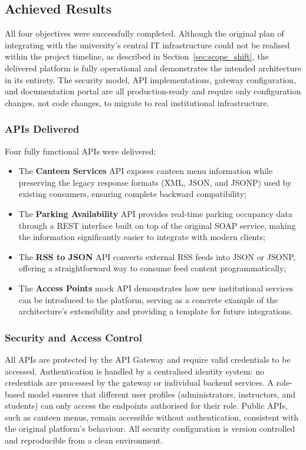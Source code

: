 \documentclass[12pt, a4paper]{report}
\begin{document}
\subsection{Achieved Results}
All four objectives were successfully completed. Although the original plan of integrating
with the university's central IT infrastructure could not be realised within the project
timeline, as described in Section~\ref{sec:scope_shift}, the delivered platform is
fully operational and demonstrates the intended architecture in its entirety. The security
model, API implementations, gateway configuration, and documentation portal are all
production-ready and require only configuration changes, not code changes, to migrate
to real institutional infrastructure.

\subsubsection{APIs Delivered}
Four fully functional APIs were delivered:

\begin{itemize}
    \item The \textbf{Canteen Services} API exposes canteen menu information while
          preserving the legacy response formats (XML, JSON, and JSONP) used by existing
          consumers, ensuring complete backward compatibility;
    \item The \textbf{Parking Availability} API provides real-time parking occupancy data
          through a REST interface built on top of the original SOAP service, making the
          information significantly easier to integrate with modern clients;
    \item The \textbf{RSS to JSON} API converts external RSS feeds into JSON or JSONP,
          offering a straightforward way to consume feed content programmatically;
    \item The \textbf{Access Points} mock API demonstrates how new institutional services
          can be introduced to the platform, serving as a concrete example of the
          architecture's extensibility and providing a template for future integrations.
\end{itemize}

\subsubsection{Security and Access Control}
All APIs are protected by the API Gateway and require valid credentials to be accessed.
Authentication is handled by a centralised identity system: no credentials are processed
by the gateway or individual backend services. A role-based model ensures that different
user profiles (administrators, instructors, and students) can only access the endpoints
authorised for their role. Public APIs, such as canteen menus, remain accessible without
authentication, consistent with the original platform's behaviour. All security
configuration is version controlled and reproducible from a clean environment.
\end{document}
